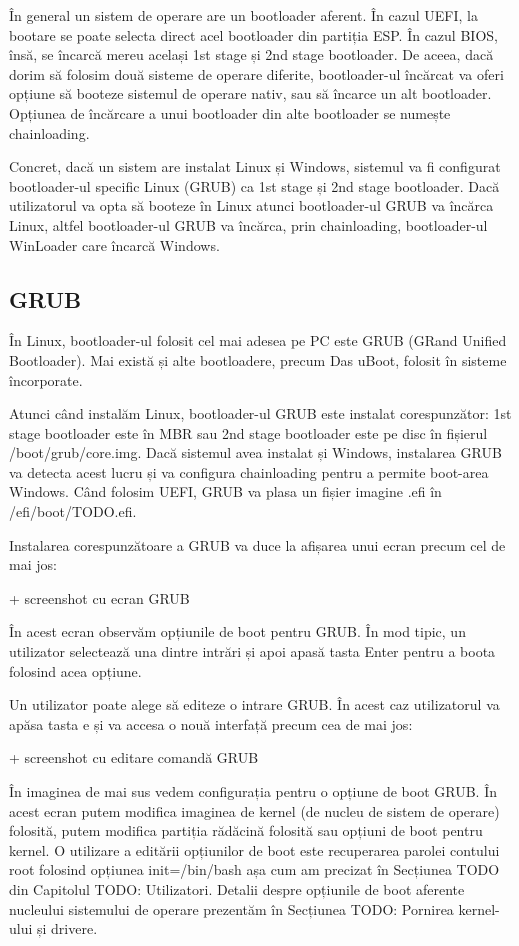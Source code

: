 În general un sistem de operare are un bootloader aferent. În cazul UEFI, la
bootare se poate selecta direct acel bootloader din partiția ESP. În cazul BIOS,
însă, se încarcă mereu același 1st stage și 2nd stage bootloader. De aceea, dacă
dorim să folosim două sisteme de operare diferite, bootloader-ul încărcat va
oferi opțiune să booteze sistemul de operare nativ, sau să încarce un alt
bootloader. Opțiunea de încărcare a unui bootloader din alte bootloader se
numește chainloading.

Concret, dacă un sistem are instalat Linux și Windows, sistemul va fi configurat
bootloader-ul specific Linux (GRUB) ca 1st stage și 2nd stage bootloader. Dacă
utilizatorul va opta să booteze în Linux atunci bootloader-ul GRUB va încărca
Linux, altfel bootloader-ul GRUB va încărca, prin chainloading, bootloader-ul
WinLoader care încarcă Windows.

\subsection{GRUB}
\label{sec:boot-bootloader-grub}

În Linux, bootloader-ul folosit cel mai adesea pe PC este GRUB (GRand Unified
Bootloader). Mai există și alte bootloadere, precum Das uBoot, folosit în
sisteme încorporate.

Atunci când instalăm Linux, bootloader-ul GRUB este instalat corespunzător: 1st
stage bootloader este în MBR sau 2nd stage bootloader este pe disc în fișierul
/boot/grub/core.img. Dacă sistemul avea instalat și Windows, instalarea GRUB va
detecta acest lucru și va configura chainloading pentru a permite boot-area
Windows. Când folosim UEFI, GRUB va plasa un fișier imagine .efi în
/efi/boot/TODO.efi.

Instalarea corespunzătoare a GRUB va duce la afișarea unui ecran precum cel de
mai jos:

+ screenshot cu ecran GRUB

În acest ecran observăm opțiunile de boot pentru GRUB. În mod tipic, un
utilizator selectează una dintre intrări și apoi apasă tasta Enter pentru a
boota folosind acea opțiune.

Un utilizator poate alege să editeze o intrare GRUB. În acest caz utilizatorul
va apăsa tasta e și va accesa o nouă interfață precum cea de mai jos:

+ screenshot cu editare comandă GRUB

În imaginea de mai sus vedem configurația pentru o opțiune de boot GRUB. În
acest ecran putem modifica imaginea de kernel (de nucleu de sistem de operare)
folosită, putem modifica partiția rădăcină folosită sau opțiuni de boot pentru
kernel. O utilizare a editării opțiunilor de boot este recuperarea parolei
contului root folosind opțiunea init=/bin/bash așa cum am precizat în Secțiunea
TODO din Capitolul TODO: Utilizatori. Detalii despre opțiunile de boot aferente
nucleului sistemului de operare prezentăm în Secțiunea TODO: Pornirea
kernel-ului și drivere.

